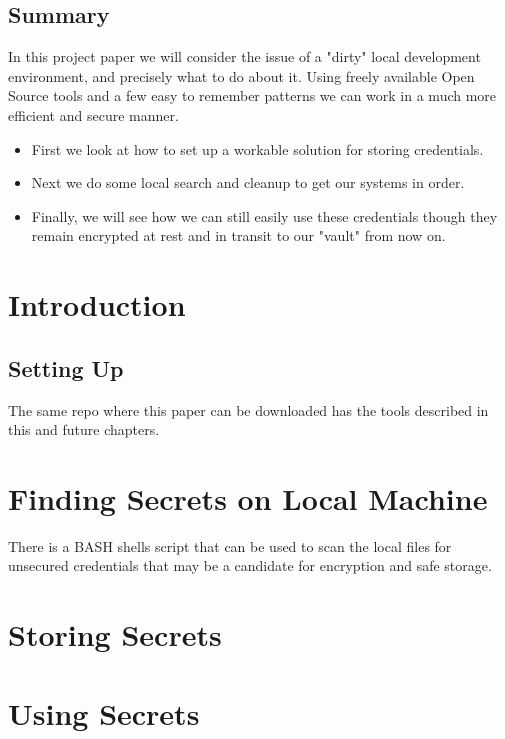 \documentclass[11pt]{report}
\begin{document}
	\section*{Summary}
    In this project paper we will consider the issue of a "dirty" local development
    environment, and precisely what to do about it. Using freely available
    Open Source tools and a few easy to remember patterns we can work in a
    much more efficient and secure manner.

    \begin{itemize}
    	\item First we look at how to set up a workable solution for storing credentials.
		\item Next we do some local search and cleanup to get our systems in order.
		\item Finally, we will see how we can still easily use these credentials though
			they remain encrypted at rest and in transit to our "vault" from now on.
    \end{itemize}

	\cleardoublepage


	\tableofcontents
	\thispagestyle{empty}
	\cleardoublepage
	\setcounter{page}{1}


	\chapter{Introduction}

    \lipsum[1]

	\section{Setting Up}

	The same repo where this paper can be downloaded has the tools described in this and future chapters.

\chapter{Finding Secrets on Local Machine}

There is a BASH shells script that can be used to scan the local files for
unsecured credentials that may be a candidate for encryption and safe storage.

\chapter{Storing Secrets}

	\lipsum[1]

	\chapter{Using Secrets}

	\lipsum[1]
\end{document}
